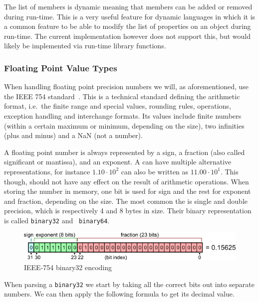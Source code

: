 The list of members is dynamic meaning that members can be added
or removed during run-time. This is a very useful feature for dynamic languages
in which it is a common feature to be able to modify the list of properties on
an object during run-time. The current implementation however does not support
this, but would likely be implemented via run-time library functions.

\subsubsection{Floating Point Value Types}

When handling floating point precision numbers we will, as aforementioned, use
the IEEE 754 standard~\cite{ieee754}. This is a technical standard defining the
arithmetic format, i.e.~the finite range and special values, rounding rules,
operations, exception handling and interchange formats. Its values include
finite numbers (within a certain maximum or minimum, depending on the size), two
infinities (plus and minus) and a NaN (not a number).

A floating point number is always represented by a sign, a fraction (also called
significant or mantissa), and an exponent. A can have multiple alternative
representations, for instance $1.10 \cdot 10^2$ can also be written as
$11.00 \cdot 10^1$. This though, should not have any effect on the result of
arithmetic operations. When storing the number in memory, one bit is used for
sign and the rest for exponent and fraction, depending on the size. The most
common the is single and double precision, which is respectively 4 and 8 bytes
in size. Their binary representation is called {\tt binary32} and {\tt
  binary64}.

\begin{figure}[H]
  \centering
  \includegraphics[scale=0.7]{images/ieee32.png}
  \caption[Caption for LOF]{IEEE-754 binary32 encoding~\footnotemark}
\end{figure}

When parsing a {\tt binary32} we start by taking all the correct bits out into
separate numbers. We can then apply the following formula to get its decimal
value.

